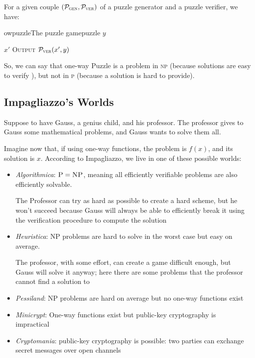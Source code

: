 For a given couple $(\mathcal{P}_\textsc{gen},\mathcal{P}_\textsc{ver})$ of a puzzle generator and a puzzle verifier, we have:

\begin{cryptogame}{owpuzzle}{The puzzle game}{puzzle}
    {$y$}
    {}

    \postlevel

    \send{}
    {$x'$}
    {\textsc{Output} $\mathcal{P}_\textsc{ver}(x', y)$}

\end{cryptogame}

So, we can say that one-way Puzzle is a problem in \textsc{np} (because solutions are easy to verify ), but not in \textsc{p} (because a solution is
hard to provide).

\subsection{Impagliazzo's Worlds}

Suppose to have Gauss, a genius child, and his professor. The professor gives to Gauss some mathematical problems, and Gauss wants to solve them all.

Imagine now that, if using one-way functions, the problem is $f(x)$, and its solution is $x$. According to Impagliazzo, we live in one of these possible worlds:
\begin{itemize}
    \item \textit{Algorithmica}: $\textsc{P} = \textsc{NP}$, meaning all efficiently verifiable problems are also efficiently solvable. 
    
    The Professor can try as hard as possible to create a hard scheme, but he won't succeed because Gauss will always be able to efficiently break it using the verification procedure to compute the solution

    \item \textit{Heuristica}: \textsc{NP} problems are hard to solve in the worst case but easy on average. 
    
    The professor, with some effort, can create a game difficult enough, but Gauss will solve it anyway; here there are some problems that the professor cannot find a solution to

    \item \textit{Pessiland}: \textsc{NP} problems are hard on average but no one-way functions exist
    
    \item \textit{Minicrypt}: One-way functions exist but public-key cryptography is impractical
    
    \item \textit{Cryptomania}: public-key cryptography is possible: two parties can exchange secret messages over open channels
\end{itemize}
    
